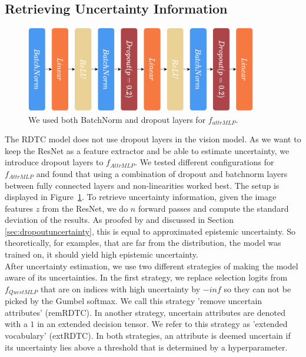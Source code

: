 \documentclass[a4paper,cleardoubleempty,BCOR1cm, 11pt]{report}
\begin{document}
\subsection{Retrieving Uncertainty Information}
\begin{figure}
	\centering
	\includegraphics[width=0.9\textwidth]{images/f_attrMLP.pdf} 
	\caption{We used both BatchNorm and dropout layers for $f_{attrMLP}$.}
	\label{fig:f_attrMLP}
\end{figure}
The RDTC model does not use dropout layers in the vision model. As we want to keep the ResNet as a feature extractor and be able to estimate uncertainty, we introduce dropout layers to $f_{AttrMLP}$. We tested different configurations for $f_{AttrMLP}$ and found that using a combination of dropout and batchnorm layers between fully connected layers and non-linearities worked best. The setup is displayed in Figure~\ref{fig:f_attrMLP}. To retrieve uncertainty information, given the image features $z$ from the ResNet, we do $n$ forward passes and compute the standard deviation of the results. As proofed by \citet{gal2016dropout} and discussed in Section \ref{sec:dropoutuncertainty}, this is equal to approximated epistemic uncertainty. So theoretically, for examples, that are far from the distribution, the model was trained on, it should yield high epistemic uncertainty.\\
After uncertainty estimation, we use two different strategies of making the model aware of its uncertainties. In the first strategy, we replace selection logits from $f_{QuestMLP}$ that are on indices with high uncertainty by $-inf$ so they can not be picked by the Gumbel softmax. We call this strategy 'remove uncertain attributes' (remRDTC). In another strategy, uncertain attributes are denoted with a $1$ in an extended decision tensor. We refer to this strategy as 'extended vocabulary' (extRDTC). In both strategies, an attribute is deemed uncertain if its uncertainty lies above a threshold that is determined by a hyperparameter.
\end{document}

